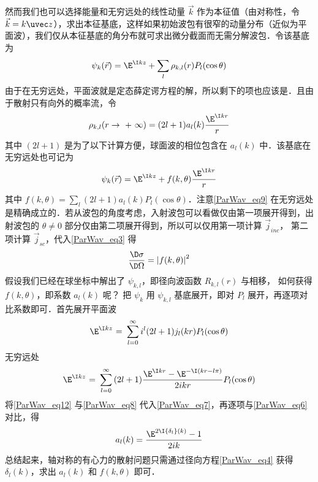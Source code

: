 然而我们也可以选择能量和无穷远处的线性动量 $\vec k$ 作为本征值（由对称性，令 $\vec k=k\uvec z$），求出本征基底，这样如果初始波包有很窄的动量分布（近似为平面波），我们仅从本征基底的角分布就可求出微分截面而无需分解波包．令该基底为
\begin{equation}\label{ParWav_eq7}
{\psi_k}(\vec r) = {\E^{\I kz}} + \sum\limits_l {{\rho_{k,l}}(r){P_l}(\cos \theta )} 
\end{equation}
由于在无穷远处，平面波就是定态薛定谔方程的解，所以剩下的项也应该是．且由于散射只有向外的概率流，令
\begin{equation}\label{ParWav_eq8}
{\rho_{k,l}}(r \to {\text{ + }}\infty ) = (2l + 1){a_l}(k)\frac{{{\E^{\I kr}}}}{r}
\end{equation}
其中 $(2l + 1)$ 是为了以下计算方便，球面波的相位包含在 ${a_l}(k)$ 中．该基底在无穷远处也可记为
\begin{equation}\label{ParWav_eq9}
{\psi_k}(\vec r) = {\E^{\I kz}} + f(k,\theta )\frac{{{\E^{\I kr}}}}{r}
\end{equation}
其中 $f(k,\theta ) = \sum\limits_l {(2l + 1){a_l}(k){P_l}(\cos \theta )}$．注意\autoref{ParWav_eq9} 在无穷远处是精确成立的．若从波包的角度考虑，入射波包可以看做仅由第一项展开得到，出射波包的 $\theta  \ne 0$ 部分仅由第二项展开得到，所以可以仅用第一项计算 ${\vec j_{inc}}$， 第二项计算 ${\vec j_{sc}}$，代入\autoref{ParWav_eq3} 得
\begin{equation}
\frac{{\D \sigma }}{{\D \Omega }} = {\left| {f(k,\theta )} \right|^2}
\end{equation}
假设我们已经在球坐标中解出了 ${\psi_{k,l}}$，即径向波函数 ${R_{k,l}}(r)$ 与相移， 如何获得 $f(k,\theta )$，即系数 ${a_l}(k)$ 呢？ 把 ${\psi_k}$ 用 $\psi_{k,l}$ 基底展开，即对 ${P_l}$ 展开，再逐项对比系数即可．首先展开平面波
\begin{equation}
{\E^{\I kz}}{\text{ = }}\sum\limits_{l = 0}^\infty  {{i^l}(2l + 1){j_l}(kr){P_l}(\cos \theta )} 
\end{equation}
无穷远处
\begin{equation}\label{ParWav_eq12}
{\E^{\I kz}}{\text{ = }}\sum\limits_{l = 0}^\infty  {(2l + 1)\frac{{{\E^{\I kr}} - {\E^{ - \I(kr - l\pi )}}}}{{2ikr}}{P_l}(\cos \theta )} 
\end{equation}
将\autoref{ParWav_eq12} 与\autoref{ParWav_eq8} 代入\autoref{ParWav_eq7}，再逐项与\autoref{ParWav_eq6} 对比，得
\begin{equation}
{a_l}(k) = \frac{{{\E^{2\I {\delta_l}(k)}} - 1}}{{2ik}}
\end{equation}
总结起来，轴对称的有心力的散射问题只需通过径向方程\autoref{ParWav_eq4} 获得 ${\delta_l}(k)$，求出 ${a_l}(k)$ 和 $f(k,\theta )$ 即可．

